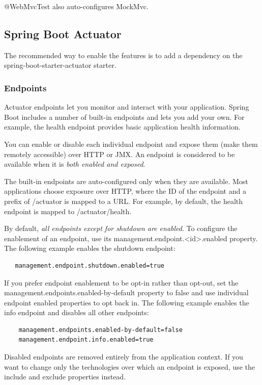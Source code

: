 \documentclass{scrartcl}
\begin{document}
@WebMvcTest also auto-configures MockMvc.


\subsection{Spring Boot Actuator}

The recommended way to enable the features is to add a dependency on the spring-boot-starter-actuator starter.

\subsubsection{Endpoints}

Actuator endpoints let you monitor and interact with your application. Spring Boot includes a number of built-in endpoints and lets you add your own. For example, the health endpoint provides basic application health information.

You can enable or disable each individual endpoint and expose them (make them remotely accessible) over HTTP or JMX. An endpoint is considered to be available when it is \textit{both enabled and exposed}.

The built-in endpoints are auto-configured only when they are available. Most applications choose exposure over HTTP, where the ID of the endpoint and a prefix of /actuator is mapped to a URL. For example, by default, the health endpoint is mapped to /actuator/health.

By default, \textit{all endpoints except for shutdown are enabled}. To configure the enablement of an endpoint, use its management.endpoint.<id>.enabled property. The following example enables the shutdown endpoint:

\begin{lstlisting}
   management.endpoint.shutdown.enabled=true
\end{lstlisting}

If you prefer endpoint enablement to be opt-in rather than opt-out, set the management.endpoints.enabled-by-default property to false and use individual endpoint enabled properties to opt back in. The following example enables the info endpoint and disables all other endpoints:

\begin{lstlisting}
    management.endpoints.enabled-by-default=false
    management.endpoint.info.enabled=true
\end{lstlisting}

Disabled endpoints are removed entirely from the application context. If you want to change only the technologies over which an endpoint is exposed, use the include and exclude properties instead.
\end{document}
